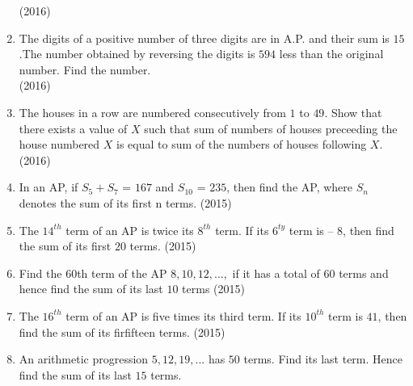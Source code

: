 \begin{enumerate}[label=\thesubsection.\arabic*,ref=\thesubsection.\theenumi,itemsep=1pt]
\hfill(2016) \item The digits of a positive number of three digits are in A.P. and their sum is $15$.The number obtained by reversing the digits is $594$ less than the original number. Find the number.\\
\hfill(2016) \item The houses in a row are numbered consecutively from $1$ to $49$. Show that there exists a value of $X$ such that sum of numbers of houses preceeding the house numbered $X$ is equal to sum of the numbers of houses following $X$.
\hfill(2016)
 \item In an AP, if $S_5 + S_7$ = $167$ and $S_10$ = $235$, then find the AP, where $S_n$ denotes the sum of its first n terms.
\hfill(2015) \item The $14^{th}$ term of an AP is twice its $8^{th}$ term. If its $6^{ty}$ term is – $8$, then find the sum of its first $20$ terms.
\hfill(2015) \item Find the 60th term of the AP $8, 10,  12, ...,$ if it has a total of 60 terms and hence find the sum of its last $10$ terms
\hfill(2015) \item The $16^{th}$ term of an {AP} is five times its third term. If its $10^{th}$ term is $41$, then find the sum of its firfifteen terms.
\hfill(2015)
 \item An arithmetic progression $5, 12, 19, ...$ has $50$ terms. Find its last term. Hence find the sum of its last $15$ terms.


\end{enumerate}
